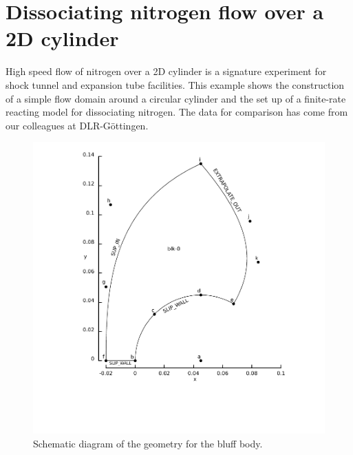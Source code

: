 
\section{Dissociating nitrogen flow over a 2D cylinder}
\label{sec:n90}
%
High speed flow of nitrogen over a 2D cylinder is a signature experiment for shock tunnel
and expansion tube facilities.
This example shows the construction of a simple flow domain around a circular cylinder
and the set up of a finite-rate reacting model for dissociating nitrogen.
The data for comparison has come from our colleagues at DLR-G\"{o}ttingen.

\begin{figure}[htbp]
\begin{center}
\includegraphics[width=12cm,viewport=76 80 391 439,clip=true]{../2D/n90/n90-schematic.pdf}
\end{center}
\caption{Schematic diagram of the geometry for the bluff body.}
\label{n90-geometry-fig}
\end{figure}


